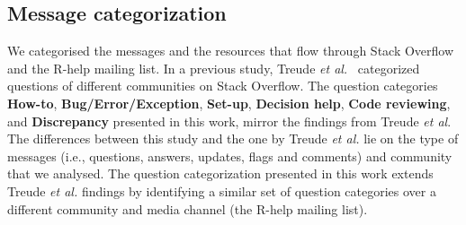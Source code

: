 \documentclass{sig-alternate-05-2015}
\begin{document}
\subsection{Message categorization}

	We categorised the messages and the resources that flow through Stack Overflow and the R-help mailing list.
	In a previous study, Treude \textit{et al.}~\cite{Treude2011} categorized questions of different communities on Stack Overflow.
	The question categories \textbf{How-to}, \textbf{Bug/Error/Exception}, \textbf{Set-up}, \textbf{Decision help}, \textbf{Code reviewing}, and \textbf{Discrepancy} presented in this work, mirror the findings from Treude \textit{et al}. 
	The differences between this study and the one by Treude \textit{et al.} lie on the type of messages (i.e., questions, answers, updates, flags and comments) and community that we analysed. 
	The question categorization presented in this work extends Treude \textit{et al.} findings by identifying a similar set of question categories over a different community and media channel (the R-help mailing list).




\end{document}

